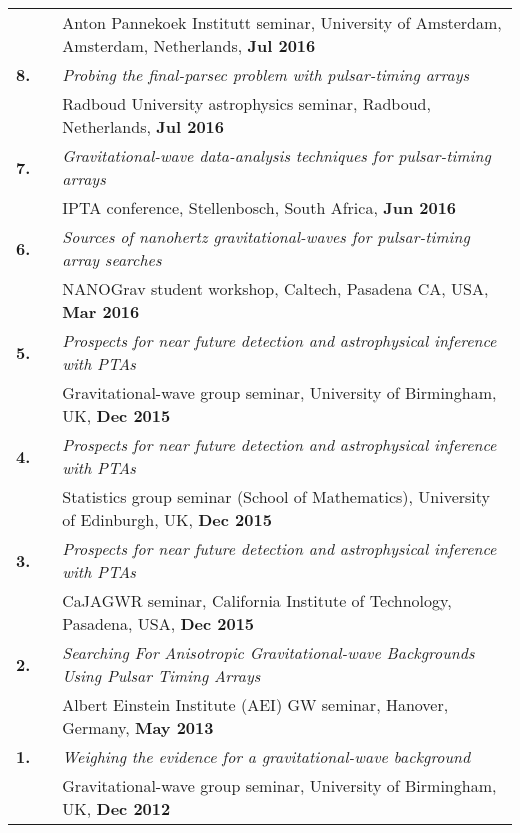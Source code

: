\documentclass[11pt,letterpaper,sans]{moderncv}
\begin{document}
{\begin{longtable}{rp{0.3cm}p{15.8cm}}
&& Anton Pannekoek Institutt seminar, University of Amsterdam, Amsterdam, Netherlands, \textbf{Jul 2016} \vspace{0.09cm}\\
\textbf{8.} & & \textit{Probing the final-parsec problem with pulsar-timing arrays} \\ 
&& Radboud University astrophysics seminar, Radboud, Netherlands, \textbf{Jul 2016} \vspace{0.09cm}\\
\textbf{7.} & & \textit{Gravitational-wave data-analysis techniques for pulsar-timing arrays} \\ 
&& IPTA conference, Stellenbosch, South Africa, \textbf{Jun 2016} \vspace{0.09cm}\\
\textbf{6.} & & \textit{Sources of nanohertz gravitational-waves for pulsar-timing array searches} \\ 
&& NANOGrav student workshop, Caltech, Pasadena CA, USA, \textbf{Mar 2016} \vspace{0.09cm}\\
\textbf{5.} & & \textit{Prospects for near future detection and astrophysical inference with PTAs} \\ 
&& Gravitational-wave group seminar, University of Birmingham, UK, \textbf{Dec 2015} \vspace{0.09cm}\\
\textbf{4.} & & \textit{Prospects for near future detection and astrophysical inference with PTAs} \\ 
&& Statistics group seminar (School of Mathematics), University of Edinburgh, UK, \textbf{Dec 2015} \vspace{0.09cm}\\
\textbf{3.} & & \textit{Prospects for near future detection and astrophysical inference with PTAs} \\ 
&& CaJAGWR seminar, California Institute of Technology, Pasadena, USA, \textbf{Dec 2015} \vspace{0.09cm}\\
\textbf{2.} & & \textit{Searching For Anisotropic Gravitational-wave Backgrounds Using Pulsar Timing Arrays} \\ 
&& Albert Einstein Institute (AEI) GW seminar, Hanover, Germany, \textbf{May 2013} \vspace{0.09cm}\\
\textbf{1.} & & \textit{Weighing the evidence for a gravitational-wave background} \\ 
&& Gravitational-wave group seminar, University of Birmingham, UK, \textbf{Dec 2012} 
\end{longtable}
}
\end{document}
